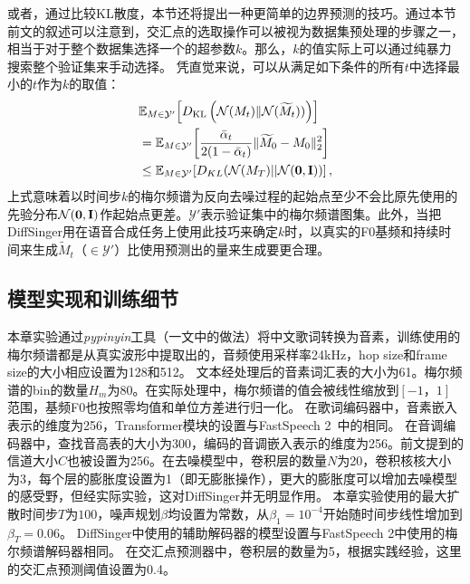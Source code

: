 或者，通过比较KL散度，本节还将提出一种更简单的边界预测的技巧。通过本节前文的叙述可以注意到，交汇点的选取操作可以被视为数据集预处理的步骤之一，相当于对于整个数据集选择一个的超参数$k$。那么，$k$的值实际上可以通过纯暴力搜索整个验证集来手动选择。
凭直觉来说，可以从满足如下条件的所有$t$中选择最小的$t$作为$k$的取值：
\begin{align}
    &\mathbb{E}_{M\in \mathcal{Y'}}\!\left[D_{\mathrm{KL}}\left(\mathcal{N}(M_t)  \| \mathcal{N}(\widetilde{M}_t))\right)\right] \\
    &=  \mathbb{E}_{M\in \mathcal{Y'}}\!\left[\frac{\bar\alpha_t}{2(1-\bar\alpha_t)} \|\widetilde{M}_0-M_0 \| _2^2\right]\\ &\leq \mathbb{E}_{M\in \mathcal{Y'}}\!\left[D_{KL}(\mathcal{N}(M_T) || \mathcal{N}(\mathbf{0}, \mathbf{I}))\right],
\end{align}
上式意味着以时间步$k$的梅尔频谱为反向去噪过程的起始点至少不会比原先使用的先验分布$\mathcal{N}(\mathbf{0}, \mathbf{I})$作起始点更差。$\mathcal{Y'}$表示验证集中的梅尔频谱图集。此外，当把DiffSinger用在语音合成任务上使用此技巧来确定$k$时，以真实的F0基频和持续时间来生成$\widetilde{M}_t$（$\in \mathcal{Y'}$）比使用预测出的量来生成要更合理。
\subsection{模型实现和训练细节}
\label{sec:svs_inference}
本章实验通过\textit{pypinyin}工具（\citet{ren2020deepsinger}一文中的做法）将中文歌词转换为音素，训练使用的梅尔频谱都是从真实波形中提取出的，音频使用采样率24kHz，hop size和frame size的大小相应设置为128和512。
文本经处理后的音素词汇表的大小为61。梅尔频谱的bin的数量$H_m$为80。在实际处理中，梅尔频谱的值会被线性缩放到$[-1，1]$范围，基频F0也按照零均值和单位方差进行归一化。
在歌词编码器中，音素嵌入表示的维度为256，Transformer模块的设置与FastSpeech 2~\citep{ren2021fastspeech}中的相同。
在音调编码器中，查找音高表的大小为300，编码的音调嵌入表示的维度为256。前文提到的信道大小$C$也被设置为256。在去噪模型中，卷积层的数量$N$为20，卷积核核大小为3，每个层的膨胀度设置为1（即无膨胀操作），更大的膨胀度可以增加去噪模型的感受野，但经实际实验，这对DiffSinger并无明显作用。
本章实验使用的最大扩散时间步$T$为$100$，噪声规划$\beta$均设置为常数，从$\beta_1=10^{-4}$开始随时间步线性增加到$\beta_T=0.06$。
DiffSinger中使用的辅助解码器的模型设置与FastSpeech 2中使用的梅尔频谱解码器相同。
在交汇点预测器中，卷积层的数量为5，根据实践经验，这里的交汇点预测阈值设置为0.4。


